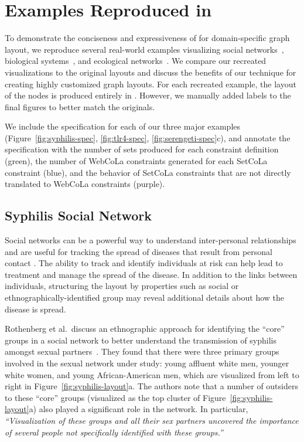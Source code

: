 \section{Examples Reproduced in \projectname}

To demonstrate the conciseness and expressiveness of \projectname for domain-specific
graph layout, we reproduce several real-world examples visualizing social 
networks~\cite{rothenberg1998using}, biological systems~\cite{barsky2008cerebral}, 
and ecological networks~\cite{kruger2017,baskerville2011spatial}. 
We compare our recreated visualizations to the original layouts and 
discuss the benefits of our technique for creating highly customized graph layouts.
For each recreated example, the layout of the nodes is produced
entirely in \projectname. However, we manually added labels to the final 
figures to better match the originals.

We include the specification for each of our three major examples 
(Figure~\ref{fig:syphilis-spec}, \ref{fig:tlr4-spec}, \ref{fig:serengeti-spec}c),
and annotate the specification with the number of sets produced for each 
constraint definition (green), the number of WebCoLa constraints generated
for each SetCoLa constraint (blue), and the behavior of SetCoLa constraints
that are not directly translated to WebCoLa constraints (purple).


\subsection{Syphilis Social Network}
\label{sec:syphilis-example}
Social networks can be a powerful way to understand inter-personal
relationships and are useful for tracking the spread of diseases that
result from personal contact \cite{rothenberg1998using,fitzpatrick2001preventable,mcelroy2003network,fu2011hiv}.
The ability to track and identify individuals at risk can help
lead to treatment and manage the spread of the disease. In
addition to the links between individuals, structuring the layout by
properties such as social or ethnographically-identified group may reveal 
additional details about how the disease is spread.

Rothenberg et al.\ discuss an ethnographic approach for identifying the
``core'' groups in a social network to better understand the transmission
of syphilis amongst sexual partners~\cite{rothenberg1998using}. They found
that there were three primary groups involved in the sexual network under study:
young affluent white men, younger white women, and young African-American men,
which are visualized from left to right in Figure~\ref{fig:syphilis-layout}a. 
The authors note that a number of outsiders to these ``core'' groups
(visualized as the top cluster of Figure~\ref{fig:syphilis-layout}a) 
also played a significant role in the network. In
particular, \emph{``Visualization of these groups and all their sex
  partners uncovered the importance of several people not specifically
  identified with these groups.''}

